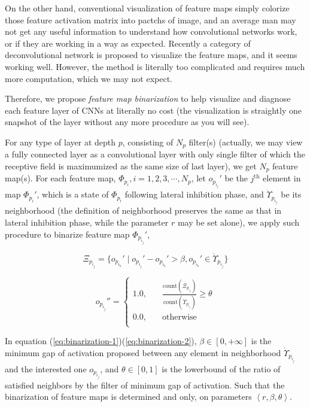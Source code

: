\documentclass[conference]{IEEEtran}
\begin{document}
On the other hand, conventional visualization of feature maps simply
colorize those feature activation matrix into pactchs of image, and an average man may not get any useful information
to understand how convolutional networks work, or if they are working in a way as expected.
Recently a category of deconvolutional network is proposed to visualize the feature maps, and it seems
working well\cite{zeiler2014visualizing}. However, the method is literally too
complicated and requires much more computation, which we may not expect.

Therefore, we propose \emph{feature map binarization} to help visualize and diagnose each feature layer of CNNs
at literally no cost (the visualization is straightly one snapshot of the layer without any more
procedure as you will see).

For any type of layer at depth $p$, consisting of $N_p$ filter(s)
(actually, we may view a fully connected layer as a convolutional layer with only
single filter of which the receptive field is maximumized as the same size of last layer),
we get $N_p$ feature map(s).
For each feature map, $\Phi_{p_i},i=1,2,3,\cdots,N_p$, let $o_{p_{i_j}}'$ be the
$j^{\text{th}}$ element in map $\Phi_{p_i}'$, which is a state of $\Phi_{p_i}$ following lateral inhibition phase,
and $\dot{\Upsilon}_{p_{i_j}}$ be its neighborhood (the definition of neighborhood
preserves the same as that in lateral inhibition phase, while the parameter $r$ may be set alone),
we apply such procedure to binarize feature map $\Phi_{p_{i_j}}'$,

\begin{equation}
    \Xi_{p_{i_j}} = \{{o_{p_{i_k}}'}\mid{o_{p_{i_j}}'}-{o_{p_{i_k}}'}>\beta,o_{p_{i_k}}'\in\dot{\Upsilon}_{p_{i_j}} \}
    \label{eq:binarization-1}
\end{equation}

\begin{equation}
o_{p_{i_j}}'' =\left\{
\begin{aligned}
    1.0,\quad& \frac{\text{count}(\Xi_{p_{i_j}})}{\text{count}(\dot{\Upsilon}_{p_{i_j}})}\ge\theta \\
    0.0,\quad& \text{otherwise}\\
\end{aligned}
\right.
\label{eq:binarization-2}
\end{equation}

In equation (\ref{eq:binarization-1})(\ref{eq:binarization-2}), $\beta\in[0,+\infty]$ is the minimum gap
of activation proposed between any element in neighborhood $\dot{\Upsilon}_{p_{i_j}}$ and the interested one $o_{p_{i_j}}$,
and $\theta\in[0,1]$ is the lowerbound of the ratio of satisfied neighbors by the filter of minimum gap of activation.
Such that the binarization of feature maps is determined and only, on parameters $\left<r,\beta,\theta\right>$.
\end{document}
